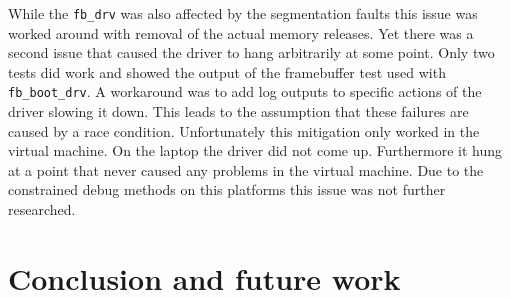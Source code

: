 \documentclass[
a4paper,
12pt,
notitlepage,
parskip=half,
DIV=11,
]{scrbook}
\begin{document}
		While the \texttt{fb\_drv} was also affected by the segmentation faults this issue was worked around with removal of the actual memory releases.
		Yet there was a second issue that caused the driver to hang arbitrarily at some point.
		Only two tests did work and showed the output of the framebuffer test used with \texttt{fb\_boot\_drv}.
		A workaround was to add log outputs to specific actions of the driver slowing it down.
		This leads to the assumption that these failures are caused by a race condition.
		Unfortunately this mitigation only worked in the virtual machine.
		On the laptop the driver did not come up.
		Furthermore it hung at a point that never caused any problems in the virtual machine.
		Due to the constrained debug methods on this platforms this issue was not further researched.
	
		\section{Conclusion and future work}
	
	
	
	
\end{document}
